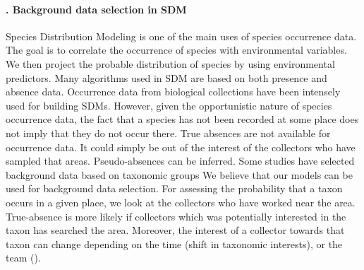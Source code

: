 \paragraph*{\theApplicationCase. Background data selection in SDM}
Species Distribution Modeling is one of the main uses of species occurrence data.
The goal is to correlate the occurrence of species with environmental variables.
We then project the probable distribution of species by using environmental predictors.
%
Many algorithms used in SDM are based on both presence and absence data.
Occurrence data from biological collections have been intensely used for building SDMs.
However, given the opportunistic nature of species occurrence data, the fact that a species has not been recorded at some place does not imply that they do not occur there.
True absences are not available for occurrence data.
It could simply be out of the interest of the collectors who have sampled that areas.
Pseudo-absences can be inferred. 
Some studies have selected background data based on taxonomic groups \cite{}
%
We believe that our models can be used for background data selection.
For assessing the probability that a taxon occurs in a given place, we look at the collectors who have worked near the area.
True-absence is more likely if collectors which was potentially interested in the taxon has searched the area.
Moreover, the interest of a collector towards that taxon can change depending on the time (shift in taxonomic interests), or the team ().



















